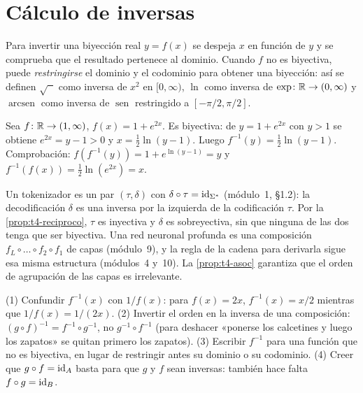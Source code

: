\section{Cálculo de inversas}

Para invertir una biyección real $y=f(x)$ se despeja $x$ en función de $y$ y se comprueba que el resultado pertenece al dominio. Cuando $f$ no es biyectiva, puede \emph{restringirse} el dominio y el codominio para obtener una biyección: así se definen $\sqrt{\phantom{x}}$ como inversa de $x^{2}$ en $[0,\infty)$, $\ln$ como inversa de $\exp\colon\mathbb{R}\to(0,\infty)$ y $\operatorname{arcsen}$ como inversa de $\operatorname{sen}$ restringido a $[-\pi/2,\pi/2]$.

\begin{ejemplo}\label{ej:t4-inversa}
Sea $f\colon\mathbb{R}\to(1,\infty)$, $f(x)=1+e^{2x}$. Es biyectiva: de $y=1+e^{2x}$ con $y>1$ se obtiene $e^{2x}=y-1>0$ y $x=\tfrac12\ln(y-1)$. Luego $f^{-1}(y)=\tfrac12\ln(y-1)$. Comprobación: $f(f^{-1}(y))=1+e^{\ln(y-1)}=y$ y $f^{-1}(f(x))=\tfrac12\ln(e^{2x})=x$.
\end{ejemplo}

\begin{observacion}
Un tokenizador es un par $(\tau,\delta)$ con $\delta\circ\tau=\mathrm{id}_{\Sigma^{*}}$ (módulo~1, §1.2): la decodificación $\delta$ es una inversa por la izquierda de la codificación $\tau$. Por la \cref{prop:t4-reciproco}, $\tau$ es inyectiva y $\delta$ es sobreyectiva, sin que ninguna de las dos tenga que ser biyectiva. Una red neuronal profunda es una composición $f_L\circ\dots\circ f_2\circ f_1$ de capas (módulo~9), y la regla de la cadena para derivarla sigue esa misma estructura (módulos~4 y~10). La \cref{prop:t4-asoc} garantiza que el orden de agrupación de las capas es irrelevante.
\end{observacion}

\begin{observacion}
(1) Confundir $f^{-1}(x)$ con $1/f(x)$: para $f(x)=2x$, $f^{-1}(x)=x/2$ mientras que $1/f(x)=1/(2x)$. (2) Invertir el orden en la inversa de una composición: $(g\circ f)^{-1}=f^{-1}\circ g^{-1}$, no $g^{-1}\circ f^{-1}$ (para deshacer «ponerse los calcetines y luego los zapatos» se quitan primero los zapatos). (3) Escribir $f^{-1}$ para una función que no es biyectiva, en lugar de restringir antes su dominio o su codominio. (4) Creer que $g\circ f=\mathrm{id}_A$ basta para que $g$ y $f$ sean inversas: también hace falta $f\circ g=\mathrm{id}_B$.
\end{observacion}

